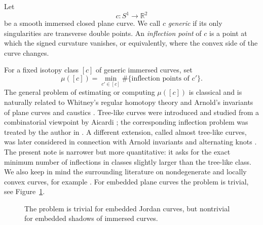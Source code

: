 \documentclass[11pt]{article}
\newcommand{\R}{\mathbb R}
\begin{document}
Let
\[
 c:S^1\to \R^2
\]
be a smooth immersed closed plane curve.  We call $c$ \emph{generic} if its only singularities are transverse double points.  An \emph{inflection point} of $c$ is a point at which the signed curvature vanishes, or equivalently, where the convex side of the curve changes.

For a fixed isotopy class $[c]$ of generic immersed curves, set
\[
 \mu([c])=\min_{c'\in[c]}\#\{\text{inflection points of }c'\}.
\]
The general problem of estimating or computing $\mu([c])$ is classical and is naturally related to Whitney's regular homotopy theory and Arnold's invariants of plane curves and caustics \cite{Whitney,ArnoldCaustics,ArnoldPlaneCurves}.  Tree-like curves were introduced and studied from a combinatorial viewpoint by Aicardi \cite{Aicardi}; the corresponding inflection problem was treated by the author in \cite{ShapiroTree}.  A different extension, called almost tree-like curves, was later considered in connection with Arnold invariants and alternating knots \cite{Dagit}.  The present note is narrower but more quantitative: it asks for the exact minimum number of inflections in classes slightly larger than the tree-like class.  We also keep in mind the surrounding literature on nondegenerate and locally convex curves, for example \cite{Little,Saldanha}. 
For embedded plane curves  the problem is trivial, see Figure~\ref{fig:oval-shadow}.



\begin{figure}[t]
\centering
{}
\caption{The problem is trivial for embedded Jordan curves, but nontrivial for embedded shadows of immersed curves.}
\label{fig:oval-shadow}
\end{figure}
\end{document}
